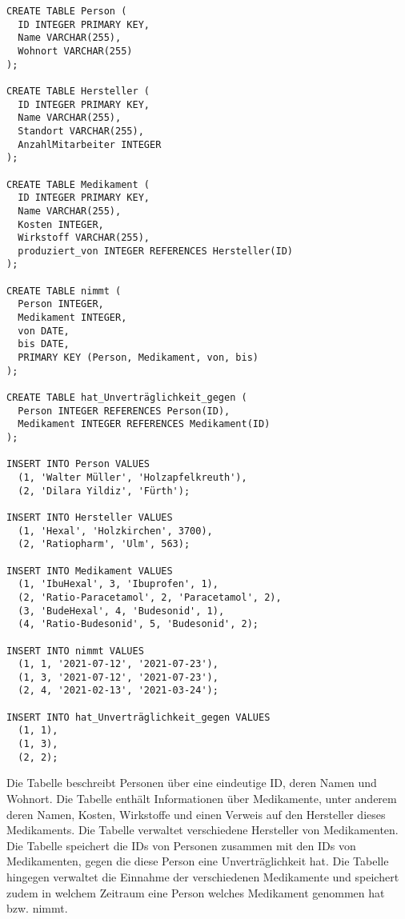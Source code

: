 \documentclass{bschlangaul-aufgabe}
\begin{document}
\begin{verbatim}
CREATE TABLE Person (
  ID INTEGER PRIMARY KEY,
  Name VARCHAR(255),
  Wohnort VARCHAR(255)
);

CREATE TABLE Hersteller (
  ID INTEGER PRIMARY KEY,
  Name VARCHAR(255),
  Standort VARCHAR(255),
  AnzahlMitarbeiter INTEGER
);

CREATE TABLE Medikament (
  ID INTEGER PRIMARY KEY,
  Name VARCHAR(255),
  Kosten INTEGER,
  Wirkstoff VARCHAR(255),
  produziert_von INTEGER REFERENCES Hersteller(ID)
);

CREATE TABLE nimmt (
  Person INTEGER,
  Medikament INTEGER,
  von DATE,
  bis DATE,
  PRIMARY KEY (Person, Medikament, von, bis)
);

CREATE TABLE hat_Unverträglichkeit_gegen (
  Person INTEGER REFERENCES Person(ID),
  Medikament INTEGER REFERENCES Medikament(ID)
);

INSERT INTO Person VALUES
  (1, 'Walter Müller', 'Holzapfelkreuth'),
  (2, 'Dilara Yildiz', 'Fürth');

INSERT INTO Hersteller VALUES
  (1, 'Hexal', 'Holzkirchen', 3700),
  (2, 'Ratiopharm', 'Ulm', 563);

INSERT INTO Medikament VALUES
  (1, 'IbuHexal', 3, 'Ibuprofen', 1),
  (2, 'Ratio-Paracetamol', 2, 'Paracetamol', 2),
  (3, 'BudeHexal', 4, 'Budesonid', 1),
  (4, 'Ratio-Budesonid', 5, 'Budesonid', 2);

INSERT INTO nimmt VALUES
  (1, 1, '2021-07-12', '2021-07-23'),
  (1, 3, '2021-07-12', '2021-07-23'),
  (2, 4, '2021-02-13', '2021-03-24');

INSERT INTO hat_Unverträglichkeit_gegen VALUES
  (1, 1),
  (1, 3),
  (2, 2);
\end{verbatim}

Die Tabelle  beschreibt Personen über eine eindeutige ID,
deren Namen und Wohnort. Die Tabelle  enthält
Informationen über Medikamente, unter anderem deren Namen, Kosten,
Wirkstoffe und einen Verweis auf den Hersteller dieses Medikaments. Die
Tabelle  verwaltet verschiedene Hersteller von
Medikamenten. Die Tabelle  speichert
die IDs von Personen zusammen mit den IDs von Medikamenten, gegen die
diese Person eine Unverträglichkeit hat. Die Tabelle  hingegen
verwaltet die Einnahme der verschiedenen Medikamente und speichert zudem
in welchem Zeitraum eine Person welches Medikament genommen hat bzw.
nimmt.
\end{document}
